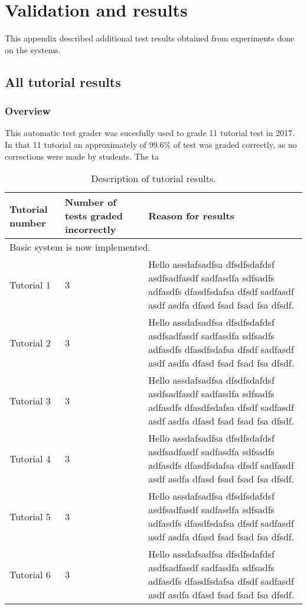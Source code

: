 \chapter{Validation and results}
\label{ap:results}
\graphicspath{{Appendix5/Appendix5figures/}}

This appendix described additional test results obtained from experiments done on the systems.

\section{All tutorial results}
\label{sec:tutorialResults}

\subsection{Overview}

This automatic test grader was sucesfully used to grade 11 tutorial test in 2017. In that 11 tutorial an approximately of 99.6\% of test was graded correctly, as no corrections were made by students. The ta

\begin{table}
\caption{Description of tutorial results.} \label{tbl:tutResults}
  \centering
\begin{tabular}{|p{3cm}|p{3cm}|p{5cm}|}
\hline
\textbf{Tutorial number}&\textbf{Number of tests graded incorrectly}&\textbf{Reason for results}\\
\hline
\multicolumn{3}{|l|}{Basic system is now implemented.}\\
\hline
Tutorial 1&3&Hello assdafsadfsa dfsdfsdafdsf asdfsadfasdf sadfasdfa sdfsadfs adfasdfs dfasdfsdafsa dfsdf sadfasdf asdf asdfa dfasd fsad fsad fsa dfsdf.\\
\hline
Tutorial 2&3&Hello assdafsadfsa dfsdfsdafdsf asdfsadfasdf sadfasdfa sdfsadfs adfasdfs dfasdfsdafsa dfsdf sadfasdf asdf asdfa dfasd fsad fsad fsa dfsdf.\\
\hline
Tutorial 3&3&Hello assdafsadfsa dfsdfsdafdsf asdfsadfasdf sadfasdfa sdfsadfs adfasdfs dfasdfsdafsa dfsdf sadfasdf asdf asdfa dfasd fsad fsad fsa dfsdf.\\
\hline
Tutorial 4&3&Hello assdafsadfsa dfsdfsdafdsf asdfsadfasdf sadfasdfa sdfsadfs adfasdfs dfasdfsdafsa dfsdf sadfasdf asdf asdfa dfasd fsad fsad fsa dfsdf.\\
\hline
Tutorial 5&3&Hello assdafsadfsa dfsdfsdafdsf asdfsadfasdf sadfasdfa sdfsadfs adfasdfs dfasdfsdafsa dfsdf sadfasdf asdf asdfa dfasd fsad fsad fsa dfsdf.\\
\hline
Tutorial 6&3&Hello assdafsadfsa dfsdfsdafdsf asdfsadfasdf sadfasdfa sdfsadfs adfasdfs dfasdfsdafsa dfsdf sadfasdf asdf asdfa dfasd fsad fsad fsa dfsdf.\\
\hline
\end{tabular} 
\end{table}

